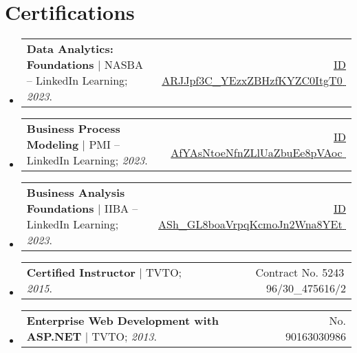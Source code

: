 \documentclass[letterpaper,11pt]{article}
\makeatletter
\let\orighref\href
\renewcommand{\href}[2]{\orighref{#1}{#2\,{\textsuperscript{\tiny{\faExternalLink}}}}}
\newcommand{\deemph}[1]{{\color{black!40}#1}}
\newcommand{\resumeProjectHeading}[2]{
    \item
    \begin{tabular*}{0.97\textwidth}{l@{\extracolsep{\fill}}r}
      \small#1 & #2 \\
    \end{tabular*}\vspace{-7pt}
}
\newcommand{\resumeSubHeadingListStart}{\begin{itemize}[leftmargin=0.15in, label={}]}
\newcommand{\resumeSubHeadingListEnd}{\end{itemize}}
\makeatother
\begin{document}
\section{Certifications}
    \resumeSubHeadingListStart
      \resumeProjectHeading
          {\textbf{Data Analytics: Foundations} $|$ NASBA -- LinkedIn Learning; \emph{2023}.}{\href{https://www.linkedin.com/learning/certificates/10c24841aac6b0c139f4971a8efd6d10356dc105124e31fa10eb32aa14ce3392}{\deemph{ID} \small{ARJJpf3C\_YEzxZBHzfKYZC0ItgT0}}}
      \resumeProjectHeading
          {\textbf{Business Process Modeling} $|$ PMI -- LinkedIn Learning; \emph{2023}.}{\href{https://www.linkedin.com/learning/certificates/3d1e244d9234631a908175486d19855434634d7f61cec316326ba4eb269bb041}{\deemph{ID} \small{AfYAsNtoeNfnZLlUaZbuEe8pVAoc}}}
      \resumeProjectHeading
          {\textbf{Business Analysis Foundations} $|$ IIBA -- LinkedIn Learning; \emph{2023}.}{\href{https://www.linkedin.com/learning/certificates/51dd265ef63b58255245c8f7438549551c92d30031e81b9ad864ee6994e1f6e6}{\deemph{ID} \small{ASh\_GL8boaVrpqKcmoJn2Wna8YEt}}}
      \resumeProjectHeading
          {\textbf{Certified Instructor} $|$ TVTO; \emph{2015}.}{\deemph{Contract No.} 5243\, 96/30\_475616/2}
    \resumeProjectHeading
          {\textbf{Enterprise Web Development with ASP.NET} $|$ TVTO; \emph{2013}.}{\deemph{No.} 90163030986}

    \resumeSubHeadingListEnd
    
\end{document}
